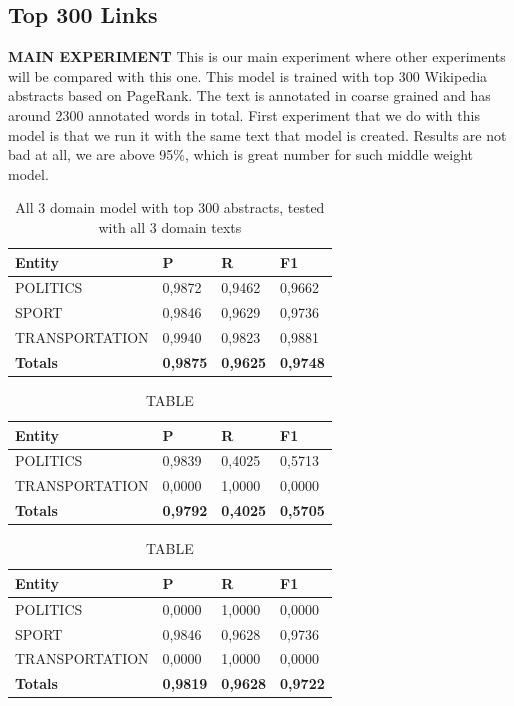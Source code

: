 \documentclass[thesis=M,english]{FITthesis}[2018/05/30]
\begin{document}

\subsection{Top 300 Links}
\textbf{MAIN EXPERIMENT}
	This is our main experiment where other experiments will be compared with this one. This model is trained with top 300 Wikipedia abstracts based on PageRank. The text is annotated in coarse grained and has around 2300 annotated words in total.
	First experiment that we do with this model is that we run it with the same text that model is created. Results are not bad at all, we are above 95\%, which is great number for such middle weight model. 		   
	\begin{table}[H]\centering
		\caption{All 3 domain model with top 300 abstracts, tested with all 3 domain texts}
		\label{}
		\begin{tabular}{|l|l|l|l|}
			\hline {\textbf{Entity}} & {\textbf{P}} & {\textbf{R}} & {\textbf{F1}}\\\hline
				POLITICS & 0,9872 & 0,9462 & 0,9662\\
				SPORT & 0,9846 & 0,9629 & 0,9736\\
				TRANSPORTATION & 0,9940 & 0,9823 & 0,9881\\\hline
				\textbf{Totals} & \textbf{0,9875} & \textbf{0,9625} & \textbf{0,9748}\\\hline
		\end{tabular}
	\end{table}

	\begin{table}[H]\centering
		\caption{TABLE}
		\label{}
		\begin{tabular}{|l|l|l|l|}
			\hline {\textbf{Entity}} & {\textbf{P}} & {\textbf{R}} & {\textbf{F1}}\\\hline
				POLITICS & 0,9839 & 0,4025 & 0,5713\\
				TRANSPORTATION & 0,0000 & 1,0000 & 0,0000\\\hline
				\textbf{Totals} & \textbf{0,9792} & \textbf{0,4025} & \textbf{0,5705}\\\hline
		\end{tabular}
	\end{table}

	\begin{table}[H]\centering
		\caption{TABLE}
		\label{}
		\begin{tabular}{|l|l|l|l|}
			\hline {\textbf{Entity}} & {\textbf{P}} & {\textbf{R}} & {\textbf{F1}}\\\hline
				POLITICS & 0,0000 & 1,0000 & 0,0000\\
				SPORT & 0,9846 & 0,9628 & 0,9736\\
				TRANSPORTATION & 0,0000 & 1,0000 & 0,0000\\\hline
				\textbf{Totals} & \textbf{0,9819} & \textbf{0,9628} & \textbf{0,9722}\\\hline
		\end{tabular}
	\end{table}	
\end{document}
